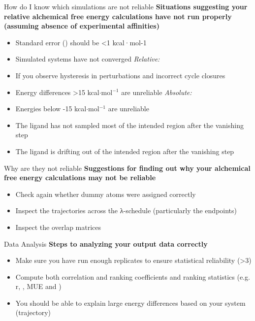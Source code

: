 \documentclass[9pt,bestpractices]{livecoms}
\begin{document}
\begin{Checklists*}[p!]
\begin{checklist}{How do I know which simulations are not reliable}
    \textbf{Situations suggesting your relative alchemical free energy calculations have not run properly (assuming absence of experimental affinities)}
        \begin{itemize}
                \item Standard error (\textsigma) should be \textless1 kcal·mol-1 
    \item Simulated systems have not converged 
    \newline\newline\textit{Relative:}
    \item If you observe hysteresis in perturbations and incorrect cycle closures
    \item Energy differences \textgreater15 kcal$\cdot$mol$^{-1}$  are unreliable
    \newline\newline\textit{Absolute:}
    \item Energies below -15 kcal$\cdot$mol$^{-1}$  are unreliable
    \item The ligand has not sampled most of the intended region after the vanishing step
    \item The ligand is drifting out of the intended region after the vanishing step
        \end{itemize}
\end{checklist}

\begin{checklist}{Why are they not reliable}
    \textbf{Suggestions for finding out why your alchemical free energy calculations may not be reliable}
\begin{itemize}
    \item Check again whether dummy atoms were assigned correctly
    \item Inspect the trajectories across the λ-schedule (particularly the endpoints)
    \item Inspect the overlap matrices
\end{itemize}
\end{checklist}

\begin{checklist}{Data Analysis}
    \textbf{Steps to analyzing your output data correctly}
\begin{itemize}
    \item Make sure you have run enough replicates to ensure statistical reliability (\textgreater3)
    \item Compute both correlation and ranking coefficients and ranking statistics (e.g. r, \textrho, MUE and \texttau)
    \item You should be able to explain large energy differences based on your system (trajectory)
\end{itemize}
\end{checklist}
\end{Checklists*}
\clearpage
\end{document}

